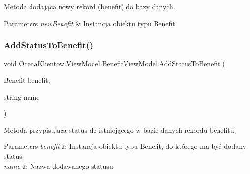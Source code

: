 Metoda dodająca nowy rekord (benefit) do bazy danych. 


\begin{DoxyParams}{Parameters}
{\em new\+Benefit} & Instancja obiektu typu Benefit\\
\hline
\end{DoxyParams}
\hypertarget{class_ocena_klientow_1_1_view_model_1_1_benefit_view_model_a67b27437f2c0a3a9ced48dc1fb1f8658}{}\label{class_ocena_klientow_1_1_view_model_1_1_benefit_view_model_a67b27437f2c0a3a9ced48dc1fb1f8658} 
\subsubsection{\texorpdfstring{Add\+Status\+To\+Benefit()}{AddStatusToBenefit()}}
{\footnotesize\ttfamily void Ocena\+Klientow.\+View\+Model.\+Benefit\+View\+Model.\+Add\+Status\+To\+Benefit (\begin{DoxyParamCaption}\item[{Benefit}]{benefit,  }\item[{string}]{name }\end{DoxyParamCaption})\hspace{0.3cm}{\ttfamily [inline]}}



Metoda przypisująca status do istniejącego w bazie danych rekordu benefitu. 


\begin{DoxyParams}{Parameters}
{\em benefit} & Instancja obiektu typu Benefit, do którego ma być dodany status\\
\hline
{\em name} & Nazwa dodawanego statusu\\
\hline
\end{DoxyParams}
\hypertarget{class_ocena_klientow_1_1_view_model_1_1_benefit_view_model_a384e8afb520c3255a8e0ae76a6f56b0d}{}\label{class_ocena_klientow_1_1_view_model_1_1_benefit_view_model_a384e8afb520c3255a8e0ae76a6f56b0d} 
